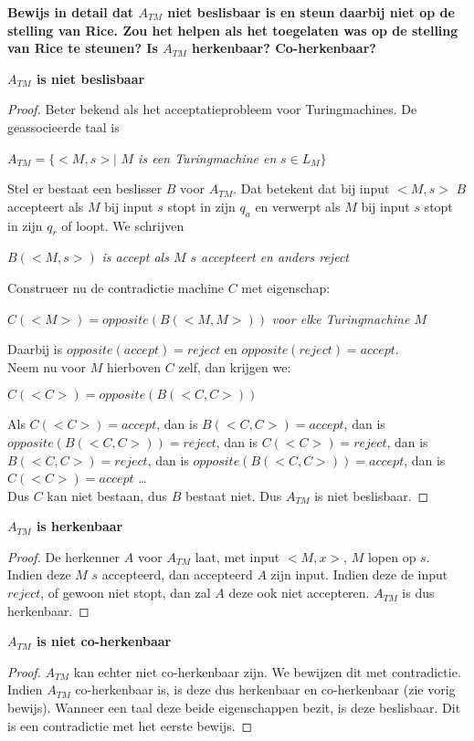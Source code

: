 \documentclass[
10pt,
a4paper,
oneside,
headinclude,footinclude, 
BCOR5mm,
]{scrartcl}
\begin{document}
\textbf{Bewijs in detail dat $A_{TM}$ niet beslisbaar is en steun daarbij niet op de stelling van Rice. Zou het helpen als het toegelaten was op de stelling van Rice te steunen? Is $A_{TM}$ herkenbaar? Co-herkenbaar?}

\vspace{5mm}
\textbf{$A_{TM}$ is niet beslisbaar}
\begin{proof}
	Beter bekend als het acceptatieprobleem voor Turingmachines. De geassocieerde taal is 
	\begin{center}
	$A_{TM} = \{ <M,s> |$ \textit{$M$ is een Turingmachine en} $ s \in L_M\}$
	\end{center}
	Stel er bestaat een beslisser $B$ voor $A_{TM}$. Dat betekent dat bij input $<M,s>$ $B$ accepteert als $M$ bij input $s$ stopt in zijn $q_a$ en verwerpt als $M$ bij input $s$ stopt in zijn $q_r$ of loopt. We schrijven
	\begin{center}
		$B(<M,s>)$ \textit{is accept als $M$ $s$ accepteert en anders reject}
	\end{center}
	Construeer nu de contradictie machine $C$ met eigenschap:
	\begin{center}
		$C(<M>) = opposite(B(<M,M>))$ \textit{voor elke Turingmachine $M$}
	\end{center}
	Daarbij is $opposite(accept) = reject$ en $opposite(reject) = accept$. \\
	Neem nu voor $M$ hierboven $C$ zelf, dan krijgen we:
	\begin{center}
		$C(<C>) = opposite(B(<C,C>))$
	\end{center}		
	Als $C(<C>) = accept$, dan is $B(<C,C>) = accept$, dan is $opposite(B(<C,C>)) = reject$, dan is $C(<C>) = reject$, dan is $B(<C,C>) = reject$, dan is $opposite(B(<C,C>)) = accept$, dan is $C(<C>) = accept$ \dots \\
	Dus $C$ kan niet bestaan, dus $B$ bestaat niet. Dus $A_{TM}$ is niet beslisbaar.
\end{proof} 

\textbf{$A_{TM}$ is herkenbaar}
\begin{proof}
	De herkenner $A$ voor $A_{TM}$ laat, met input $<M,x>$, $M$ lopen op $s$. Indien deze $M$ $s$ accepteerd, dan accepteerd $A$ zijn input. Indien deze de input $reject$, of gewoon niet stopt, dan zal $A$ deze ook niet accepteren. $A_{TM}$ is dus herkenbaar.
\end{proof}

\textbf{$A_{TM}$ is niet co-herkenbaar}
\begin{proof}
	$A_{TM}$ kan echter niet co-herkenbaar zijn. We bewijzen dit met contradictie. Indien $A_{TM}$ co-herkenbaar is, is deze dus herkenbaar en co-herkenbaar (zie vorig bewijs). Wanneer een taal deze beide eigenschappen bezit, is deze beslisbaar. Dit is een contradictie met het eerste bewijs.
\end{proof}
\end{document}
